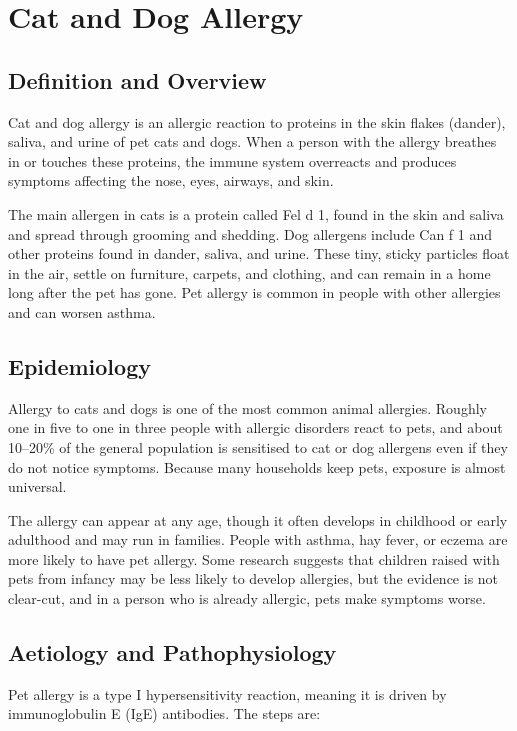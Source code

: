\chapter{Cat and Dog Allergy}

\section*{Definition and Overview}
Cat and dog allergy is an allergic reaction to proteins in the skin flakes (dander), saliva, and urine of pet cats and dogs. When a person with the allergy breathes in or touches these proteins, the immune system overreacts and produces symptoms affecting the nose, eyes, airways, and skin.

The main allergen in cats is a protein called Fel d 1, found in the skin and saliva and spread through grooming and shedding. Dog allergens include Can f 1 and other proteins found in dander, saliva, and urine. These tiny, sticky particles float in the air, settle on furniture, carpets, and clothing, and can remain in a home long after the pet has gone. Pet allergy is common in people with other allergies and can worsen asthma.

\section*{Epidemiology}
Allergy to cats and dogs is one of the most common animal allergies. Roughly one in five to one in three people with allergic disorders react to pets, and about 10--20\% of the general population is sensitised to cat or dog allergens even if they do not notice symptoms. Because many households keep pets, exposure is almost universal.

The allergy can appear at any age, though it often develops in childhood or early adulthood and may run in families. People with asthma, hay fever, or eczema are more likely to have pet allergy. Some research suggests that children raised with pets from infancy may be less likely to develop allergies, but the evidence is not clear-cut, and in a person who is already allergic, pets make symptoms worse.

\section*{Aetiology and Pathophysiology}
Pet allergy is a type I hypersensitivity reaction, meaning it is driven by immunoglobulin E (IgE) antibodies. The steps are:

